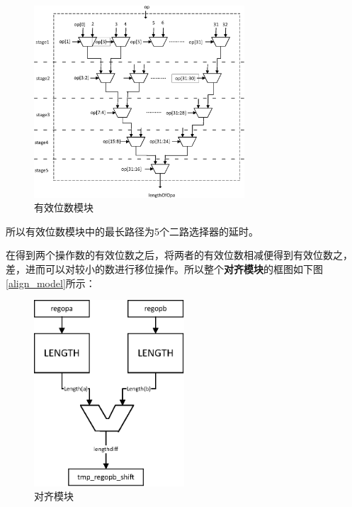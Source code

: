 \documentclass[12pt]{article}
\begin{document}
\begin{figure}[H]
\begin{center}
\includegraphics[width=0.7\textwidth]{./lowpowerdesign/length.eps}
\caption{有效位数模块}
\label{length}
\end{center}
\end{figure}

所以有效位数模块中的最长路径为5个二路选择器的延时。

在得到两个操作数的有效位数之后，将两者的有效位数相减便得到有效位数之，差，进而可以对较小的数进行移位操作。所以整个\textbf{对齐模块}的框图如下图\ref{align_model}所示：


\begin{figure}[H]
\begin{center}
\includegraphics[width=0.5\textwidth]{./lowpowerdesign/align_mdel_logic_case.eps}
\caption{对齐模块}
\label{align_model_logic_case}
\end{center}
\end{figure}
\end{document}
